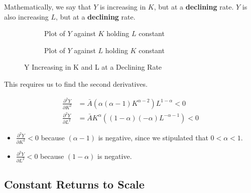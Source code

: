 \documentclass[11pt]{scrartcl}
\begin{document}
Mathematically, we say that $Y$ is increasing in $K$, but at a \textbf{declining} rate. $Y$ is also increasing $L$, but at a \textbf{declining} rate.

\begin{figure}[ht!]
\begin{subfigure}[b]{0.5\textwidth}
\caption{Plot of $Y$ against $K$ holding $L$ constant}
\end{subfigure}
\hspace{2ex}
\begin{subfigure}[b]{0.5\textwidth}
\caption{Plot of $Y$ against $L$ holding $K$ constant}
\end{subfigure}
\caption{Y Increasing in K and L at a Declining Rate}
\end{figure}

This requires us to find the second derivatives.

\begin{align*}
\frac{\partial^2 Y} {\partial K^2} &= \bar{A} (\alpha (\alpha - 1) K^{\alpha - 2}) L^{1-\alpha} < 0\\
\frac{\partial^2 Y}{\partial L^2} &= \bar{A} K^\alpha ((1-\alpha)(-\alpha)L^{-\alpha -1}) < 0
\end{align*}

\begin{itemize}
	\item $\frac{\partial^2 Y} {\partial K^2}  < 0$ because $(\alpha - 1)$ is negative, since we stipulated that $0 < \alpha < 1$. 
	\item $\frac{\partial^2 Y}{\partial L^2} < 0$ because $(1-\alpha)$ is negative.
\end{itemize}

\subsection{Constant Returns to Scale}
\end{document}
